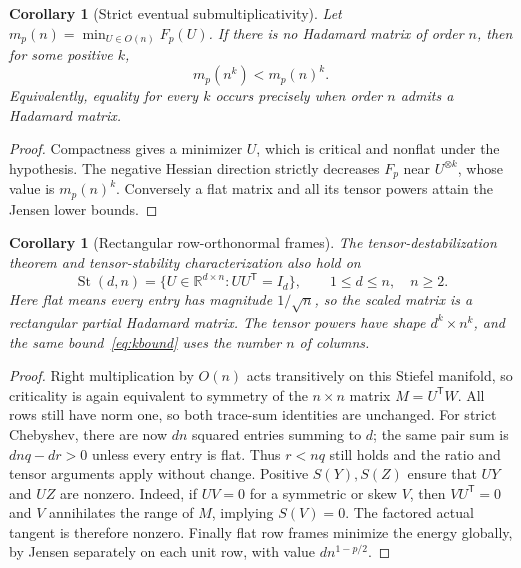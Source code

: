 \documentclass[11pt]{article}
\newtheorem{corollary}[theorem]{Corollary}
\newcommand{\R}{\mathbb R}
\begin{document}
\begin{corollary}[Strict eventual submultiplicativity]
Let $m_p(n)=\min_{U\in O(n)}F_p(U)$. If there is no Hadamard matrix
of order $n$, then for some positive $k$,
\[
 m_p(n^k)<m_p(n)^k.
\]
Equivalently, equality for every $k$ occurs precisely when order $n$
admits a Hadamard matrix.
\end{corollary}
\begin{proof}
Compactness gives a minimizer $U$, which is critical and nonflat under
the hypothesis. The negative Hessian direction strictly decreases
$F_p$ near $U^{\otimes k}$, whose value is $m_p(n)^k$. Conversely a
flat matrix and all its tensor powers attain the Jensen lower bounds.
\end{proof}

\begin{corollary}[Rectangular row-orthonormal frames]
The tensor-destabilization theorem and tensor-stability characterization
also hold on
\[
 \operatorname{St}(d,n)=\{U\in\R^{d\times n}:UU^{\mathsf T}=I_d\},
 \qquad 1\le d\le n,\quad n\ge2.
\]
Here flat means every entry has magnitude $1/\sqrt n$, so the scaled
matrix is a rectangular partial Hadamard matrix. The tensor powers have
shape $d^k\times n^k$, and the same bound~\eqref{eq:kbound} uses the
number $n$ of columns.
\end{corollary}
\begin{proof}
Right multiplication by $O(n)$ acts transitively on this Stiefel
manifold, so criticality is again equivalent to symmetry of the
$n\times n$ matrix $M=U^{\mathsf T}W$. All rows still have norm one,
so both trace-sum identities are unchanged. For strict Chebyshev, there
are now $dn$ squared entries summing to $d$; the same pair sum is
$dnq-dr>0$ unless every entry is flat. Thus $r<nq$ still holds and
the ratio and tensor arguments apply without change. Positive
$S(Y),S(Z)$ ensure that $UY$ and $UZ$ are nonzero. Indeed, if
$UV=0$ for a symmetric or skew $V$, then $VU^{\mathsf T}=0$ and
$V$ annihilates the range of $M$, implying $S(V)=0$.
The factored actual tangent is therefore nonzero. Finally flat row frames minimize the energy
globally, by Jensen separately on each unit row, with value
$d n^{1-p/2}$.
\end{proof}
\end{document}
